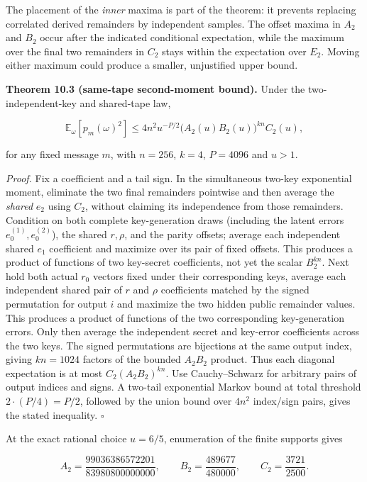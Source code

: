 \documentclass[
  11pt,
  a4paper,
  oneside]{report}
\begin{document}
The placement of the \emph{inner} maxima is part of the theorem: it
prevents replacing correlated derived remainders by independent samples.
The offset maxima in \(A_2\) and \(B_2\) occur after the indicated
conditional expectation, while the maximum over the final two remainders
in \(C_2\) stays within the expectation over \(E_2\). Moving either
maximum could produce a smaller, unjustified upper bound.

\textbf{Theorem 10.3 (same-tape second-moment bound).} Under the
two-independent-key and shared-tape law,

\[
\mathbb E_\omega[p_m(\omega)^2]
\le4n^2u^{-P/2}\bigl(A_2(u)B_2(u)\bigr)^{kn}C_2(u),
\]

for any fixed message \(m\), with \(n=256\), \(k=4\), \(P=4096\) and
\(u>1\).

\emph{Proof.} Fix a coefficient and a tail sign. In the simultaneous
two-key exponential moment, eliminate the two final remainders pointwise
and then average the \emph{shared} \(e_2\) using \(C_2\), without
claiming its independence from those remainders. Condition on both
complete key-generation draws (including the latent errors
\(e_0^{(1)},e_0^{(2)}\)), the shared \(r,\rho\), and the parity offsets;
average each independent shared \(e_1\) coefficient and maximize over
its pair of fixed offsets. This produces a product of functions of two
key-secret coefficients, not yet the scalar \(B_2^{kn}\). Next hold both
actual \(r_0\) vectors fixed under their corresponding keys, average
each independent shared pair of \(r\) and \(\rho\) coefficients matched
by the signed permutation for output \(i\) and maximize the two hidden
public remainder values. This produces a product of functions of the two
corresponding key-generation errors. Only then average the independent
secret and key-error coefficients across the two keys. The signed
permutations are bijections at the same output index, giving \(kn=1024\)
factors of the bounded \(A_2B_2\) product. Thus each diagonal
expectation is at most \(C_2(A_2B_2)^{kn}\). Use Cauchy--Schwarz for
arbitrary pairs of output indices and signs. A two-tail exponential
Markov bound at total threshold \(2\cdot(P/4)=P/2\), followed by the
union bound over \(4n^2\) index/sign pairs, gives the stated inequality.
\(\square\)

At the exact rational choice \(u=6/5\), enumeration of the finite
supports gives

\[
A_2=\frac{99036386572201}{83980800000000},\qquad
B_2=\frac{489677}{480000},\qquad
C_2=\frac{3721}{2500}.
\]
\end{document}
